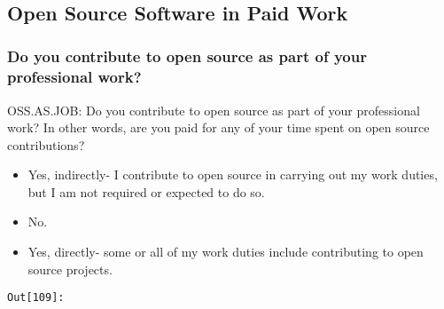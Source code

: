 \documentclass[11pt]{article}
\providecommand{\tightlist}{%
      \setlength{\itemsep}{0pt}\setlength{\parskip}{0pt}}
\begin{document}
    


    \begin{center}
    \end{center}
    { \hspace*{\fill} \\}
    
    \subsection{Open Source Software in Paid
Work}\label{open-source-software-in-paid-work}

    \subsubsection{Do you contribute to open source as part of your
professional
work?}\label{do-you-contribute-to-open-source-as-part-of-your-professional-work}

OSS.AS.JOB: Do you contribute to open source as part of your
professional work? In other words, are you paid for any of your time
spent on open source contributions?

\begin{itemize}
\tightlist
\item
  Yes, indirectly- I contribute to open source in carrying out my work
  duties, but I am not required or expected to do so.\\
\item
  No.\\
\item
  Yes, directly- some or all of my work duties include contributing to
  open source projects.
\end{itemize}

\texttt{\color{outcolor}Out[{\color{outcolor}109}]:}
    

    
\end{document}

